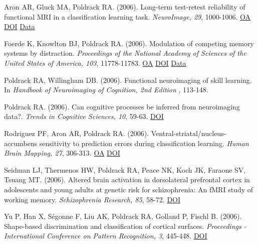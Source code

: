 \documentclass[10pt, letterpaper]{article}
\begin{document}
Aron AR, Gluck MA, Poldrack RA.  (2006). Long-term test-retest reliability of functional MRI in a classification learning task. \textit{NeuroImage, 29}, 1000-1006. \href{https://www.ncbi.nlm.nih.gov/pmc/articles/PMC1630684}{OA} \href{https://doi.org/10.1016/j.neuroimage.2005.08.010}{DOI} \href{https://openneuro.org/datasets/ds000017/versions/00001}{Data} \vspace{2mm}

Foerde K, Knowlton BJ, Poldrack RA.  (2006). Modulation of competing memory systems by distraction. \textit{Proceedings of the National Academy of Sciences of the United States of America, 103}, 11778-11783. \href{https://www.ncbi.nlm.nih.gov/pmc/articles/PMC1544246}{OA} \href{https://doi.org/10.1073/pnas.0602659103}{DOI} \href{https://openneuro.org/datasets/ds000011/versions/00001}{Data} \vspace{2mm}

Poldrack RA, Willingham DB.  (2006). Functional neuroimaging of skill learning. In \textit{Handbook of Neuroimaging of Cognition, 2nd Edition }, 113-148. \vspace{2mm}

Poldrack RA.  (2006). Can cognitive processes be inferred from neuroimaging data?. \textit{Trends in Cognitive Sciences, 10}, 59-63. \href{https://doi.org/10.1016/j.tics.2005.12.004}{DOI} \vspace{2mm}

Rodriguez PF, Aron AR, Poldrack RA.  (2006). Ventral-striatal/nucleus-accumbens sensitivity to prediction errors during classification learning. \textit{Human Brain Mapping, 27}, 306-313. \href{https://www.ncbi.nlm.nih.gov/pmc/articles/PMC6871483}{OA} \href{https://doi.org/10.1002/hbm.20186}{DOI} \vspace{2mm}

Seidman LJ, Thermenos HW, Poldrack RA, Peace NK, Koch JK, Faraone SV, Tsuang MT.  (2006). Altered brain activation in dorsolateral prefrontal cortex in adolescents and young adults at genetic risk for schizophrenia: An fMRI study of working memory. \textit{Schizophrenia Research, 85}, 58-72. \href{https://doi.org/10.1016/j.schres.2006.03.019}{DOI} \vspace{2mm}

Yu P, Han X, Ségonne F, Liu AK, Poldrack RA, Golland P, Fischl B.  (2006). Shape-based discrimination and classification of cortical surfaces. \textit{Proceedings - International Conference on Pattern Recognition, 3}, 445-448. \href{https://doi.org/10.1109/icpr.2006.1052}{DOI} \vspace{2mm}
\end{document}

